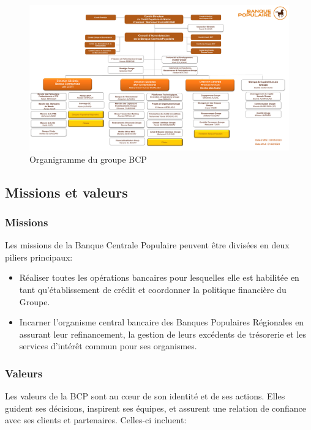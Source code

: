 \begin{figure}[H]
    \includegraphics[height=.52\textheight, angle=90, origin=c]{images/bcp-structure.jpg}
    \caption{Organigramme du groupe BCP}
\end{figure}

\clearpage

\subsection{Missions et valeurs}

\subsubsection{Missions}
Les missions de la Banque Centrale Populaire peuvent être divisées en deux piliers principaux:

\begin{itemize}
    \item Réaliser toutes les opérations bancaires pour lesquelles elle est habilitée en tant qu'établissement de crédit et coordonner la politique financière du Groupe.
    \item Incarner l'organisme central bancaire des Banques Populaires Régionales en assurant leur refinancement, la gestion de leurs excédents de trésorerie et les services d'intérêt commun pour ses organismes.
\end{itemize}

\subsubsection{Valeurs}
Les valeurs de la BCP sont au cœur de son identité et de ses actions. Elles guident ses décisions, inspirent ses équipes, et assurent une relation de confiance avec ses clients et partenaires. Celles-ci incluent:

